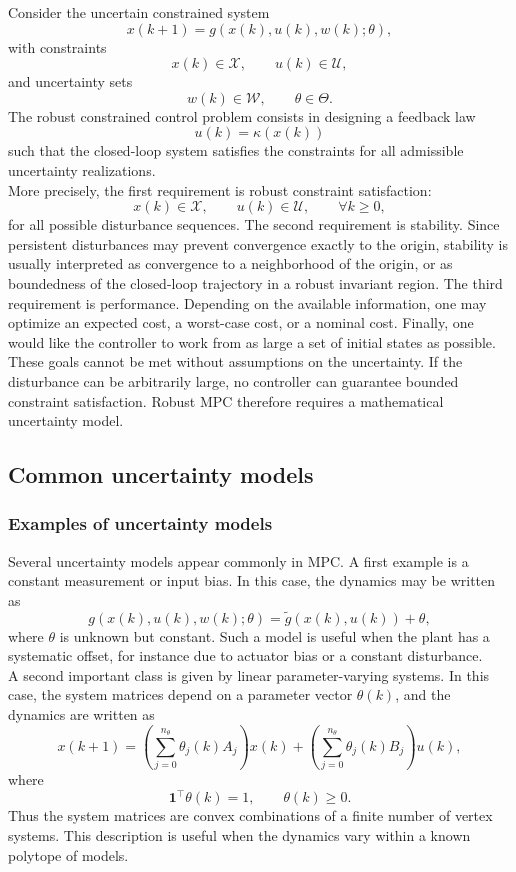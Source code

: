 Consider the uncertain constrained system
\[
    x(k+1) = g(x(k),u(k),w(k);\theta),
\]
with constraints
\[
    x(k) \in \mathcal{X}, \qquad u(k) \in \mathcal{U},
\]
and uncertainty sets
\[
    w(k) \in \mathcal{W}, \qquad \theta \in \Theta.
\]
The robust constrained control problem consists in designing a feedback law
\[
    u(k) = \kappa(x(k))
\]
such that the closed-loop system satisfies the constraints for all admissible uncertainty
realizations.\\
More precisely, the first requirement is robust constraint satisfaction:
\[
    x(k) \in \mathcal{X}, \qquad u(k) \in \mathcal{U},
    \qquad \forall k \geq 0,
\]
for all possible disturbance sequences. The second requirement is stability. Since persistent
disturbances may prevent convergence exactly to the origin, stability is usually interpreted as
convergence to a neighborhood of the origin, or as boundedness of the closed-loop trajectory in a
robust invariant region. The third requirement is performance. Depending on the available
information, one may optimize an expected cost, a worst-case cost, or a nominal cost. Finally,
one would like the controller to work from as large a set of initial states as possible.\\

These goals cannot be met without assumptions on the uncertainty. If the disturbance can be
arbitrarily large, no controller can guarantee bounded constraint satisfaction. Robust MPC
therefore requires a mathematical uncertainty model.

\subsection{Common uncertainty models}
\subsubsection{Examples of uncertainty models}
Several uncertainty models appear commonly in MPC. A first example is a constant measurement
or input bias. In this case, the dynamics may be written as
\[
    g(x(k),u(k),w(k);\theta)
    =
    \tilde g(x(k),u(k)) + \theta,
\]
where \(\theta\) is unknown but constant. Such a model is useful when the plant has a systematic
offset, for instance due to actuator bias or a constant disturbance.\\

A second important class is given by linear parameter-varying systems. In this case, the system
matrices depend on a parameter vector \(\theta(k)\), and the dynamics are written as
\[
    x(k+1)
    =
    \left(\sum_{j=0}^{n_\theta} \theta_j(k) A_j \right)x(k)
    +
    \left(\sum_{j=0}^{n_\theta} \theta_j(k) B_j \right)u(k),
\]
where
\[
    \mathbf{1}^\top \theta(k) = 1,
    \qquad
    \theta(k) \geq 0.
\]
Thus the system matrices are convex combinations of a finite number of vertex systems. This
description is useful when the dynamics vary within a known polytope of models.\\


